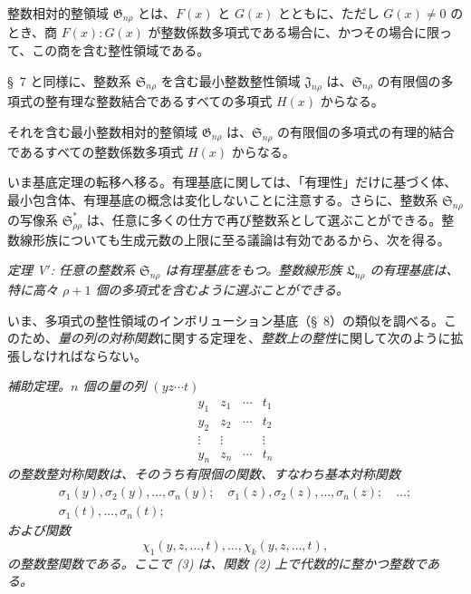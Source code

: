 \documentclass[11pt]{jlreq}
\providecommand{\Ssys}{\mathfrak{S}}
\providecommand{\Lsys}{\mathfrak{L}}
\providecommand{\Jdom}{\mathfrak{J}}
\providecommand{\Gdom}{\mathfrak{G}}
\begin{document}
整数相対的整領域 $\Gdom_{n\rho}$ とは、$F(x)$ と $G(x)$ とともに、ただし $G(x)\ne0$ のとき、商 $F(x):G(x)$ が整数係数多項式である場合に、かつその場合に限って、この商を含む整性領域である。

\S\ 7 と同様に、整数系 $\Ssys_{n\rho}$ を含む最小整数整性領域 $\Jdom_{n\rho}$ は、$\Ssys_{n\rho}$ の有限個の多項式の整有理な整数結合であるすべての多項式 $H(x)$ からなる。

それを含む最小整数相対的整領域 $\Gdom_{n\rho}$ は、$\Ssys_{n\rho}$ の有限個の多項式の有理的結合であるすべての整数係数多項式 $H(x)$ からなる。

いま基底定理の転移へ移る。有理基底に関しては、「有理性」だけに基づく体、最小包含体、有理基底の概念は変化しないことに注意する。さらに、整数系 $\Ssys_{n\rho}$ の写像系 $\Ssys^*_{\rho\rho}$ は、任意に多くの仕方で再び整数系として選ぶことができる。整数線形族についても生成元数の上限に至る議論は有効であるから、次を得る。

\emph{定理 V$'$: 任意の整数系 $\Ssys_{n\rho}$ は有理基底をもつ。整数線形族 $\Lsys_{n\rho}$ の有理基底は、特に高々 $\rho+1$ 個の多項式を含むように選ぶことができる。}

いま、多項式の整性領域のインボリューション基底（\S\ 8）の類似を調べる。このため、\emph{量の列の対称関数}に関する定理を、\emph{整数上の整性}に関して次のように拡張しなければならない。

\emph{補助定理。$n$ 個の量の列 $(yz\cdots t)$}
\begin{equation}
\begin{array}{cccc}
  y_1&z_1&\cdots&t_1\\
  y_2&z_2&\cdots&t_2\\
  \vdots&\vdots&&\vdots\\
  y_n&z_n&\cdots&t_n
\end{array}
\tag{1}
\end{equation}
\emph{の整数整対称関数は、そのうち有限個の関数、すなわち基本対称関数}
\begin{equation}
\begin{gathered}
  \sigma_1(y),\sigma_2(y),\ldots,\sigma_n(y);\quad
  \sigma_1(z),\sigma_2(z),\ldots,\sigma_n(z);\quad\ldots;\\
  \sigma_1(t),\ldots,\sigma_n(t);
\end{gathered}
\tag{2}
\end{equation}
\emph{および関数}
\begin{equation}
  \chi_1(y,z,\ldots,t),\ldots,\chi_k(y,z,\ldots,t),
\tag{3}
\end{equation}
\emph{の整数整関数である。ここで (3) は、関数 (2) 上で代数的に整かつ整数である。}
\end{document}
